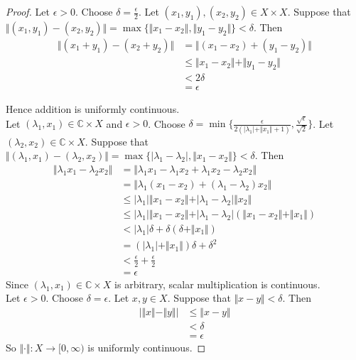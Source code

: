 \documentclass[12pt]{amsart}
\newcommand{\del}{\delta}
\newcommand{\lam}{\lambda}
\newcommand{\ep}{\epsilon}
\newcommand{\C}{\mathbb{C}}
\newcommand{\Rg}{[0,\infty)}
\newcommand{\n}{\Vert}
\begin{document}
\begin{proof}
Let $\ep > 0$. Choose $\del = \frac{\ep}{2}$. Let $(x_1,y_1), (x_2,y_2) \in X \times X$. Suppose that $\n (x_1,y_1)-(x_2,y_2) \n  = \max\{\n x_1-x_2 \n , \n y_1 - y_2 \n \} < \del$. Then 
\begin{align*}
\n (x_1 + y_1) - (x_2+y_2) \n
&= \n (x_1-x_2) + (y_1-y_2) \n\\
& \leq \n  x_1-x_2 \n + \n y_1-y_2 \n\\
& < 2\del \\
&= \ep
\end{align*} 

Hence addition is uniformly continuous. \vspace{1cm}\\ Let $(\lam_1,x_1) \in \C \times X$ and $\ep >0$. Choose $\del = \min\{\frac{\ep}{2(\vert \lam_1 \vert + \n x_1 \n + 1)}, \frac{\sqrt{\ep}}{\sqrt{2}}\}$. Let $(\lam_2, x_2) \in \C \times X$. Suppose that $\n (\lam_1, x_1)-(\lam_2,x_2) \n  = \max\{\vert \lam_1-\lam_2 \vert , \n x_1 - x_2 \n \} < \del$. Then 
\begin{align*}
\n \lam_1x_1 - \lam_2x_2 \n
&= \n \lam_1x_1 - \lam_1x_2 + \lam_1x_2- \lam_2x_2 \n\\
&= \n \lam_1(x_1-x_2) + (\lam_1-\lam_2)x_2 \n \\
& \leq \vert \lam_1 \vert \n  x_1-x_2 \n + \vert \lam_1-\lam_2 \vert \n x_2\n\\
& \leq \vert \lam_1 \vert  \n  x_1-x_2 \n + \vert \lam_1-\lam_2 \vert (\n x_1 -x_2\n + \n x_1\n )\\
& < \vert \lam_1 \vert \del  +  \del( \del + \n x_1 \n)\\
&= (\vert \lam_1 \vert + \n x_1 \n) \del + \del^2 \\
&< \frac{\ep}{2}+ \frac{\ep}{2}\\
&= \ep
\end{align*}
Since $(\lam_1, x_1) \in \C \times X$ is arbitrary, scalar multiplication is continuous. \vspace{1cm} \\ Let $\ep > 0$. Choose $\del = \ep$. Let $x,y \in X$. Suppose that $\n x-y \n < \del$. Then 
\begin{align*}
\big \vert \n x \n - \n y \n \big  \vert
& \leq \n x - y \n\\
&< \del\\
&=\ep
\end{align*}  
So $\n \cdot \n : X \rightarrow \Rg$ is uniformly continuous.
\end{proof}
\end{document}

